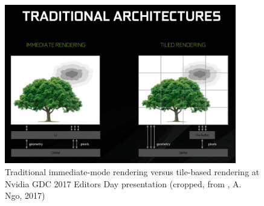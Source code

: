 \begin{figure}[t]
  \centering
  \includegraphics[width=0.9\textwidth]{pictures/Nvidia_TileImmediate}
  \caption{Traditional immediate-mode rendering versus tile-based rendering at Nvidia GDC 2017 Editors Day presentation (cropped, from \cite{.08.02.2020}, A. Ngo, 2017)} \label{fig:blob}
\end{figure}